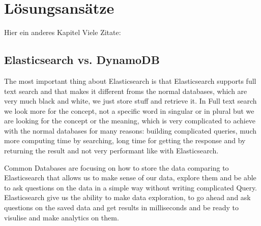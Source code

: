 \chapter{Lösungsansätze}
    Hier ein anderes Kapitel
    Viele Zitate: \cite{patterson} \cite{krizhevsky} \cite{matlab} \cite{pitts} \cite{lawrence} \cite{miesbach}
    \section{Elasticsearch vs. DynamoDB}
        
        The most important thing about Elasticsearch is that Elasticsearch supports full text search and that makes it different froms the normal databases, which are very much black and white, we just store stuff and retrieve it. In Full text search we look more for the concept, not a specific word in singular or in plural but we are looking for the concept or the meaning, which is very complicated to achieve with the normal databases for many reasons: building complicated queries, much more computing time by searching, long time for getting the response and by returning the result and not very performant like with Elasticsearch.
        
        Common Databases are focusing on how to store the data comparing to Elasticsearch that allows us to make sense of our data, explore them and be able to ask questions on the data in a simple way without writing complicated Query.
        Elasticsearch give us the ability to make data exploration, to go ahead and ask questions on the saved data and get results in milliseconds and be ready to visulise and make analytics on them.
               
